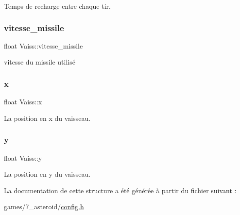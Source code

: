 Temps de recharge entre chaque tir. 

\mbox{\label{struct_vaiss_a505eb5f7ba36b2908a93da45d647413c}} 
\subsubsection{\texorpdfstring{vitesse\+\_\+missile}{vitesse\_missile}}
{\footnotesize\ttfamily float Vaiss\+::vitesse\+\_\+missile}



vitesse du missile utilisé 

\mbox{\label{struct_vaiss_adf25c355add352aee76780722e5c4435}} 
\subsubsection{\texorpdfstring{x}{x}}
{\footnotesize\ttfamily float Vaiss\+::x}



La position en x du vaisseau. 

\mbox{\label{struct_vaiss_a6b9897f16bb39baba8b2e2a30ca405f9}} 
\subsubsection{\texorpdfstring{y}{y}}
{\footnotesize\ttfamily float Vaiss\+::y}



La position en y du vaisseau. 



La documentation de cette structure a été générée à partir du fichier suivant \+:\begin{DoxyCompactItemize}
\item 
games/7\+\_\+asteroid/\hyperlink{7__asteroid_2config_8h}{config.\+h}\end{DoxyCompactItemize}
